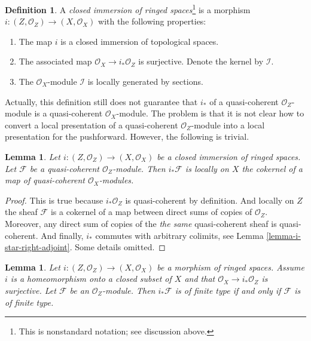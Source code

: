 \documentclass{stacks-project}
\theoremstyle{plain}
\newtheorem{lemma}[subsection]{Lemma}
\theoremstyle{definition}
\newtheorem{definition}[subsection]{Definition}
\theoremstyle{remark}
\numberwithin{equation}{subsection}
\begin{document}
\begin{definition}
\label{definition-closed-immersion}
A {\it closed immersion of ringed spaces}\footnote{This is
nonstandard notation; see discussion above.} is a morphism
$i : (Z, \mathcal{O}_Z) \to (X, \mathcal{O}_X)$
with the following properties:
\begin{enumerate}
\item The map $i$ is a closed immersion of topological spaces.
\item The associated map $\mathcal{O}_X \to i_*\mathcal{O}_Z$
is surjective. Denote the kernel by $\mathcal{I}$.
\item The $\mathcal{O}_X$-module $\mathcal{I}$ is locally
generated by sections.
\end{enumerate}
\end{definition}

\noindent
Actually, this definition still does not guarantee that
$i_*$ of a quasi-coherent $\mathcal{O}_Z$-module is a
quasi-coherent $\mathcal{O}_X$-module. The problem is that
it is not clear how to convert a local presentation of
a quasi-coherent $\mathcal{O}_Z$-module into a local
presentation for the pushforward. However, the following
is trivial.

\begin{lemma}
\label{lemma-i-star-quasi-coherent}
Let $i : (Z, \mathcal{O}_Z) \to (X, \mathcal{O}_X)$
be a closed immersion of ringed spaces.
Let $\mathcal{F}$ be a quasi-coherent $\mathcal{O}_Z$-module.
Then $i_*\mathcal{F}$ is locally on $X$ the cokernel of
a map of quasi-coherent $\mathcal{O}_X$-modules.
\end{lemma}

\begin{proof}
This is true because $i_*\mathcal{O}_Z$ is quasi-coherent
by definition. And locally on $Z$ the sheaf $\mathcal{F}$
is a cokernel of a map between direct sums of copies
of $\mathcal{O}_Z$. Moreover, any direct sum of copies of the
{\it the same} quasi-coherent sheaf is quasi-coherent.
And finally, $i_*$ commutes with arbitrary colimits,
see Lemma \ref{lemma-i-star-right-adjoint}. Some details omitted.
\end{proof}

\begin{lemma}
\label{lemma-i-star-reflects-finite-type}
Let $i : (Z, \mathcal{O}_Z) \to (X, \mathcal{O}_X)$ be a morphism of ringed
spaces. Assume $i$ is a homeomorphism onto a closed subset of $X$ and
that $\mathcal{O}_X \to i_*\mathcal{O}_Z$ is surjective.
Let $\mathcal{F}$ be an $\mathcal{O}_Z$-module.
Then $i_*\mathcal{F}$ is of finite type if and only if
$\mathcal{F}$ is of finite type.
\end{lemma}
\end{document}
